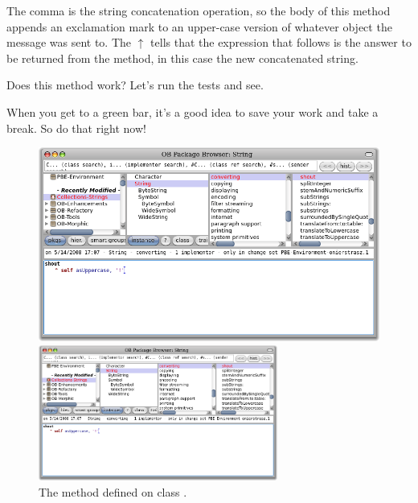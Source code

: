 \documentclass[a4paper,10pt,twoside]{book}
\begin{document}
The comma is the string concatenation operation, so the body of this method appends an exclamation mark to an upper-case version of whatever  object the  message was sent to.
The $\uparrow$ tells \pharo that the expression that follows is the answer to be returned from the method, in this case the new concatenated string.

Does this method work?  Let's run the tests and see.

When you get to a green bar\footnotemark, it's a good idea to save your work and take a break.  
So do that right now!

\begin{figure}[hbt]
\ifluluelse
	{\centerline{\includegraphics[width=\textwidth]{String-Shout}}}
	{\centerline{\includegraphics[width=0.7\textwidth]{String-Shout}}}
\caption{The  method defined on class .
\label{fig:String-shout}}
\end{figure}
\end{document}
